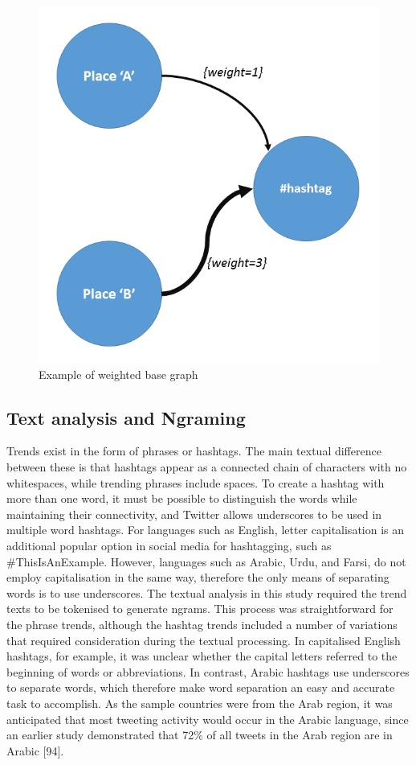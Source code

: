 \documentclass[conference]{IEEEtran}
\begin{document}
\begin{figure}[htb] \centering
\includegraphics[width=\columnwidth]{images/base_graph.png}
\caption{Example of weighted base graph}
\label{fig:basegraph}
\end{figure}


\subsection{Text analysis and Ngraming}

Trends exist in the form of phrases or hashtags. The main textual
difference between these is that hashtags appear as a connected chain
of characters with no whitespaces, while trending phrases include
spaces. To create a hashtag with more than one word, it must be
possible to distinguish the words while maintaining their
connectivity, and Twitter allows underscores to be used in multiple
word hashtags. For languages such as English, letter capitalisation is
an additional popular option in social media for hashtagging, such as
\#ThisIsAnExample. However, languages such as Arabic, Urdu, and Farsi,
do not employ capitalisation in the same way, therefore the only means
of separating words is to use underscores.  The textual analysis in
this study required the trend texts to be tokenised to generate
ngrams. This process was straightforward for the phrase trends,
although the hashtag trends included a number of variations that
required consideration during the textual processing. In capitalised
English hashtags, for example, it was unclear whether the capital
letters referred to the beginning of words or abbreviations. In
contrast, Arabic hashtags use underscores to separate words, which
therefore make word separation an easy and accurate task to
accomplish. As the sample countries were from the Arab region, it was
anticipated that most tweeting activity would occur in the Arabic
language, since an earlier study demonstrated that 72\% of all tweets
in the Arab region are in Arabic [94].
\end{document}

